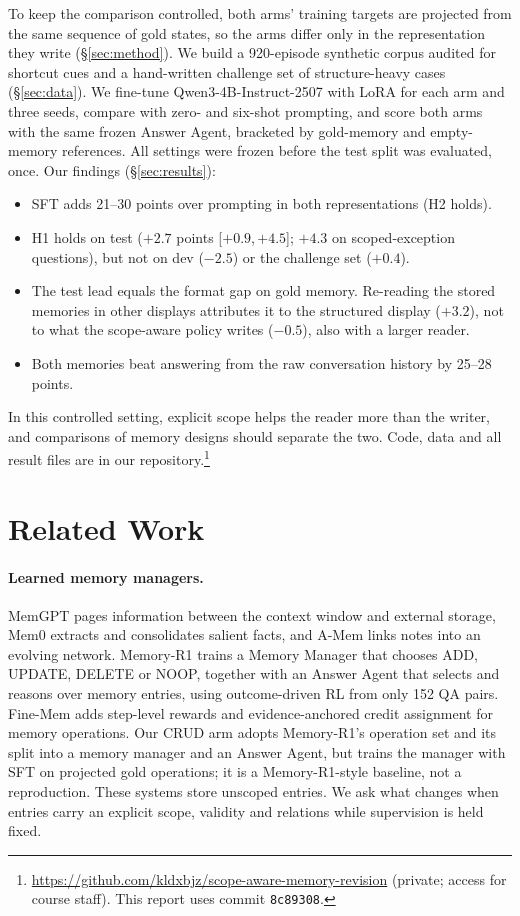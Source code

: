 \documentclass[11pt]{article}
\newcommand{\iv}[2]{[$#1$,\,$#2$]}
\begin{document}
To keep the comparison controlled, both arms' training targets are projected from the same sequence of gold states, so the arms differ only in the representation they write (\S\ref{sec:method}). We build a 920-episode synthetic corpus audited for shortcut cues and a hand-written challenge set of structure-heavy cases (\S\ref{sec:data}). We fine-tune Qwen3-4B-Instruct-2507 \citep{yang2025qwen3} with LoRA \citep{hu2022lora} for each arm and three seeds, compare with zero- and six-shot prompting, and score both arms with the same frozen Answer Agent, bracketed by gold-memory and empty-memory references. All settings were frozen before the test split was evaluated, once. Our findings (\S\ref{sec:results}):
\begin{itemize}
\item SFT adds 21--30 points over prompting in both representations (H2 holds).
\item H1 holds on test ($+2.7$ points \iv{+0.9}{+4.5}; $+4.3$ on scoped-exception questions), but not on dev ($-2.5$) or the challenge set ($+0.4$).
\item The test lead equals the format gap on gold memory. Re-reading the stored memories in other displays attributes it to the structured display ($+3.2$), not to what the scope-aware policy writes ($-0.5$), also with a larger reader.
\item Both memories beat answering from the raw conversation history by 25--28 points.
\end{itemize}
In this controlled setting, explicit scope helps the reader more than the writer, and comparisons of memory designs should separate the two. Code, data and all result files are in our repository.\footnote{\url{https://github.com/kldxbjz/scope-aware-memory-revision} (private; access for course staff). This report uses commit \texttt{8c89308}.}

\section{Related Work}

\paragraph{Learned memory managers.} MemGPT \citep{packer2023memgpt} pages information between the context window and external storage, Mem0 \citep{chhikara2025mem0} extracts and consolidates salient facts, and A-Mem \citep{xu2025amem} links notes into an evolving network. Memory-R1 \citep{yan-etal-2026-memory} trains a Memory Manager that chooses ADD, UPDATE, DELETE or NOOP, together with an Answer Agent that selects and reasons over memory entries, using outcome-driven RL from only 152 QA pairs. Fine-Mem \citep{ma-etal-2026-fine} adds step-level rewards and evidence-anchored credit assignment for memory operations. Our CRUD arm adopts Memory-R1's operation set and its split into a memory manager and an Answer Agent, but trains the manager with SFT on projected gold operations; it is a Memory-R1-style baseline, not a reproduction. These systems store unscoped entries. We ask what changes when entries carry an explicit scope, validity and relations while supervision is held fixed.
\end{document}
